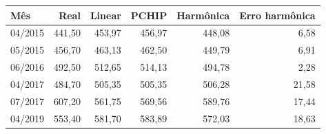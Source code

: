 \begin{tabular}{lrrrrr}
\toprule
Mês & Real & Linear & PCHIP & Harmônica & Erro harmônica \\
\midrule
04/2015 & 441,50 & 453,97 & 456,97 & 448,08 & 6,58 \\
05/2015 & 456,70 & 463,13 & 462,50 & 449,79 & 6,91 \\
06/2016 & 492,50 & 512,65 & 514,13 & 494,78 & 2,28 \\
04/2017 & 484,70 & 505,35 & 505,35 & 506,28 & 21,58 \\
07/2017 & 607,20 & 561,75 & 569,56 & 589,76 & 17,44 \\
04/2019 & 553,40 & 581,70 & 583,89 & 572,03 & 18,63 \\
\bottomrule
\end{tabular}
